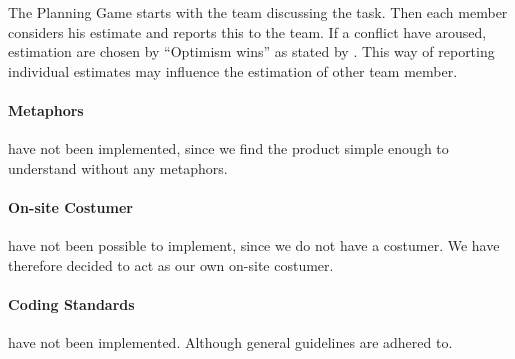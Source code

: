 The Planning Game starts with the team discussing the task. Then each member considers his estimate and reports this to the team. If a conflict have aroused, estimation are chosen by ``Optimism wins'' as stated by \citet[p. 58]{xp:planning}.
This way of reporting individual estimates may influence the estimation of other team member. 
 

\paragraph{Metaphors} have not been implemented, since we find the product simple enough to understand without any metaphors. 

\paragraph{On-site Costumer} have not been possible to implement, since we do not have a costumer. We have therefore decided to act as our own on-site costumer.

\paragraph{Coding Standards} have not been implemented. Although general guidelines are adhered to.
